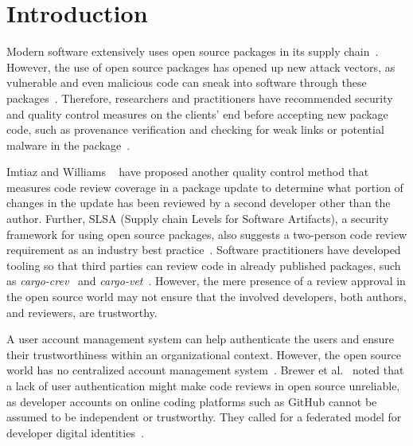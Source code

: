 \documentclass[10pt,journal,compsoc]{IEEEtran}
\begin{document}
\section{Introduction}

Modern software extensively uses open source packages in its supply chain~\cite{blackduck2021}. However, the use of open source packages has opened up new attack vectors, as vulnerable and even malicious code can sneak into software through these packages~\cite{ohm2020backstabber}. Therefore, researchers and practitioners have recommended security and quality control measures on the clients' end before accepting new package code, such as provenance verification and checking for weak links or potential malware in the package~\cite{slsa, zahan2022weak, torres2019toto, ferreira2021containing, vu2021lastpymile, ferreira2021containing}.

Imtiaz and Williams ~\cite{imtiaz2022phantom} have proposed another quality control method that measures code review coverage in a package update to determine what portion of changes in the update has been reviewed by a second developer other than the author.
Further, SLSA (Supply chain Levels for Software Artifacts), a security framework for using open source packages, also suggests a two-person code review requirement as an industry best practice~\cite{slsa}.
Software practitioners have developed tooling so that third parties can review code in already published packages, such as \textit{cargo-crev}~\cite{cargocrev} and \textit{cargo-vet}~\cite{cargovet}.
However, the mere presence of a review approval in the open source world may not ensure that the involved developers, both authors, and reviewers, are trustworthy. 

A user account management system can help authenticate the users and ensure their trustworthiness within an organizational context. However, the open source world has no centralized account management system~\cite{hawthorne2005software}. Brewer et al.~\cite{googleopensource} noted that a lack of user authentication might make code reviews in open source unreliable,
as developer accounts on online coding platforms such as GitHub cannot be assumed to be independent or trustworthy. They called for a federated model for developer digital identities~\cite{googleopensource}. 
\end{document}
